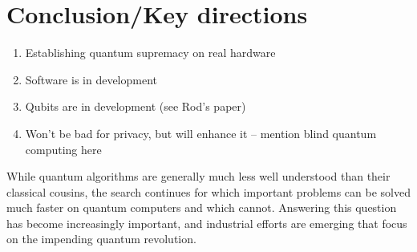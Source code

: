 \documentclass[journal]{IEEEtran}
\begin{document}
\section{Conclusion/Key directions}
\begin{enumerate}
\item    Establishing quantum supremacy on real hardware
\item     Software is in development
\item     Qubits are in development (see Rod's paper)
\item     Won't be bad for privacy, but will enhance it -- mention blind quantum computing here
\end{enumerate}

While quantum algorithms are generally much less well understood than their classical cousins, the search continues for which important problems can be solved much faster on quantum computers and which cannot. Answering this question has become increasingly important, and industrial efforts are emerging that focus on the impending quantum revolution.



%
%

\end{document}
